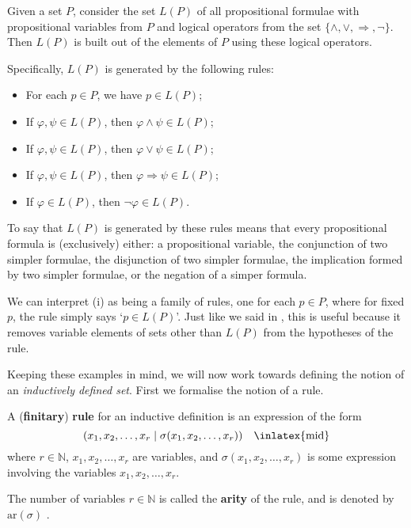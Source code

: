 \begin{example}
\label{exPropositionalFormulaeAsInductivelyDefinedSetPreliminary}
Given a set $P$, consider the set $L(P)$ of all propositional formulae with propositional variables from $P$ and logical operators from the set $\{ {\wedge}, {\vee}, {\Rightarrow}, {\neg} \}$. Then $L(P)$ is built out of the elements of $P$ using these logical operators.

Specifically, $L(P)$ is generated by the following rules:
\begin{itemize}
\item For each $p \in P$, we have $p \in L(P)$;
\item If $\varphi, \psi \in L(P)$, then $\varphi \wedge \psi \in L(P)$;
\item If $\varphi, \psi \in L(P)$, then $\varphi \vee \psi \in L(P)$;
\item If $\varphi, \psi \in L(P)$, then $\varphi \Rightarrow \psi \in L(P)$;
\item If $\varphi \in L(P)$, then $\neg \varphi \in L(P)$.
\end{itemize}

To say that $L(P)$ is generated by these rules means that every propositional formula is (exclusively) either: a propositional variable, the conjunction of two simpler formulae, the disjunction of two simpler formulae, the implication formed by two simpler formulae, or the negation of a simper formula.

We can interpret (i) as being a family of rules, one for each $p \in P$, where for fixed $p$, the rule simply says `$p \in L(P)$'. Just like we said in , this is useful because it removes variable elements of sets other than $L(P)$ from the hypotheses of the rule.
\end{example}

Keeping these examples in mind, we will now work towards defining the notion of an \textit{inductively defined set}. First we formalise the notion of a rule.

\begin{definition}
\label{defRuleForInductiveDefinition}
A (\textbf{finitary}) \textbf{rule} for an inductive definition is an expression of the form
\[ (x_1,x_2,\dots,x_r \mid \sigma(x_1,x_2,\dots,x_r)) \quad \text{\inlatex{mid}} \]
where $r \in \mathbb{N}$, $x_1,x_2,\dots,x_r$ are variables, and $\sigma(x_1,x_2,\dots,x_r)$ is some expression involving the variables $x_1,x_2,\dots,x_r$.

The number of variables $r \in \mathbb{N}$ is called the \textbf{arity} of the rule, and is denoted by $\mathrm{ar}(\sigma)$ .
\end{definition}

